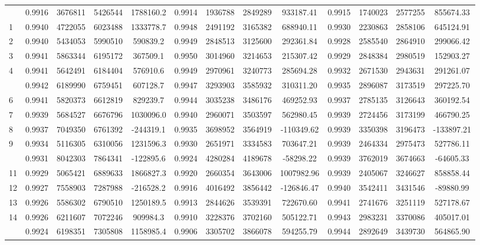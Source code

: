 \documentclass[
  12pt,
]{article}
\begin{document}
\begin{longtable}[t]{lcccccccccccc}
\endfoot
\bottomrule
\endlastfoot
0 & 0.9916 & 3676811 & 5426544 & 1788160.2 & 0.9914 & 1936788 & 2849289 & 933187.41 & 0.9915 & 1740023 & 2577255 & 855674.33\\
1 & 0.9940 & 4722055 & 6023488 & 1333778.7 & 0.9948 & 2491192 & 3165382 & 688940.11 & 0.9930 & 2230863 & 2858106 & 645124.91\\
2 & 0.9940 & 5434053 & 5990510 & 590839.2 & 0.9949 & 2848513 & 3125600 & 292361.84 & 0.9928 & 2585540 & 2864910 & 299066.42\\
3 & 0.9941 & 5863344 & 6195172 & 367509.1 & 0.9950 & 3014960 & 3214653 & 215307.42 & 0.9929 & 2848384 & 2980519 & 152903.27\\
4 & 0.9941 & 5642491 & 6184404 & 576910.6 & 0.9949 & 2970961 & 3240773 & 285694.28 & 0.9932 & 2671530 & 2943631 & 291261.07\\
\addlinespace
5 & 0.9942 & 6189990 & 6759451 & 607128.7 & 0.9947 & 3293903 & 3585932 & 310311.20 & 0.9935 & 2896087 & 3173519 & 297225.70\\
6 & 0.9941 & 5820373 & 6612819 & 829239.7 & 0.9944 & 3035238 & 3486176 & 469252.93 & 0.9937 & 2785135 & 3126643 & 360192.54\\
7 & 0.9939 & 5684527 & 6676796 & 1030096.0 & 0.9940 & 2960071 & 3503597 & 562980.45 & 0.9939 & 2724456 & 3173199 & 466790.25\\
8 & 0.9937 & 7049350 & 6761392 & -244319.1 & 0.9935 & 3698952 & 3564919 & -110349.62 & 0.9939 & 3350398 & 3196473 & -133897.21\\
9 & 0.9934 & 5116305 & 6310056 & 1231596.3 & 0.9930 & 2651971 & 3334583 & 703647.21 & 0.9939 & 2464334 & 2975473 & 527786.11\\
\addlinespace
10 & 0.9931 & 8042303 & 7864341 & -122895.6 & 0.9924 & 4280284 & 4189678 & -58298.22 & 0.9939 & 3762019 & 3674663 & -64605.33\\
11 & 0.9929 & 5065421 & 6889633 & 1866827.3 & 0.9920 & 2660354 & 3643006 & 1007982.96 & 0.9939 & 2405067 & 3246627 & 858858.44\\
12 & 0.9927 & 7558903 & 7287988 & -216528.2 & 0.9916 & 4016492 & 3856442 & -126846.47 & 0.9940 & 3542411 & 3431546 & -89880.99\\
13 & 0.9926 & 5586302 & 6790510 & 1250189.5 & 0.9913 & 2844626 & 3539391 & 722670.60 & 0.9941 & 2741676 & 3251119 & 527178.67\\
14 & 0.9926 & 6211607 & 7072246 & 909984.3 & 0.9910 & 3228376 & 3702160 & 505122.71 & 0.9943 & 2983231 & 3370086 & 405017.01\\
\addlinespace
15 & 0.9924 & 6198351 & 7305808 & 1158985.4 & 0.9906 & 3305702 & 3866078 & 594255.79 & 0.9944 & 2892649 & 3439730 & 564865.90\\

\end{longtable}
\end{document}
